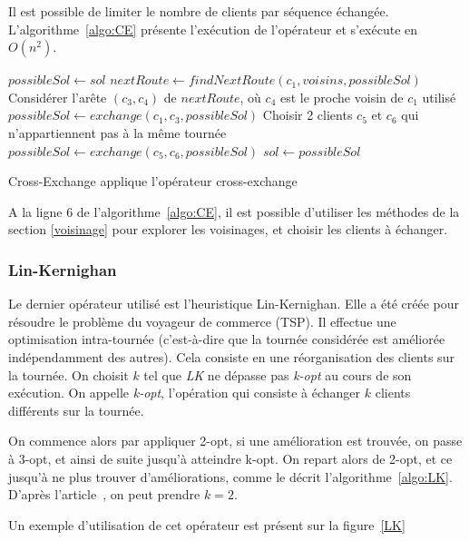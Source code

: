 \documentclass[a4paper,11pt]{article}%
\begin{document}
Il est possible de limiter le nombre de clients par séquence échangée.
L'algorithme~\ref{algo:CE} présente l'exécution de l'opérateur et s'exécute en $O(n^2)$.

\begin{algorithm}
\DontPrintSemicolon 
{}
$possibleSol \gets sol$\;
$nextRoute \gets findNextRoute(c_1,voisins,possibleSol)$\;
Considérer l'arête $(c_3,c_4)$ de $nextRoute$, où $c_4$ est le proche voisin de $c_1$ utilisé\;
$possibleSol \gets exchange(c_1,c_3,possibleSol)$\;
Choisir 2 clients $c_5$ et $c_6$ qui n'appartiennent pas à la même tournée\;
$possibleSol \gets exchange(c_5,c_6,possibleSol)$\;
 {
	$sol \gets possibleSol$\;
}
\;
\caption{{\sc Cross-Exchange} applique l'opérateur cross-exchange}
\label{algo:CE}
\end{algorithm}

A la ligne $6$ de l'algorithme~\ref{algo:CE}, il est possible d'utiliser les méthodes de la section \ref{voisinage} pour explorer les voisinages, et choisir les clients à échanger.

\subsubsection{Lin-Kernighan}

Le dernier opérateur utilisé est l'heuristique Lin-Kernighan. Elle a été créée pour résoudre le problème du voyageur de commerce (TSP). 
Il effectue une optimisation intra-tournée (c'est-à-dire que la tournée considérée est améliorée indépendamment des autres).
Cela consiste en une réorganisation des clients sur la tournée. On choisit $k$ tel que \emph{LK} ne dépasse pas \emph{k-opt} au cours de son exécution. 
On appelle \emph{k-opt}, l'opération qui consiste à échanger $k$ clients différents sur la tournée.

On commence alors par appliquer 2-opt, si une amélioration est trouvée, on passe à 3-opt, et ainsi de suite jusqu'à atteindre k-opt. 
On repart alors de 2-opt, et ce jusqu'à ne plus trouver d'améliorations, comme le décrit l'algorithme~\ref{algo:LK}.
D'après l'article~\cite{Sorensen_2017}, on peut prendre $k = 2$.
 
Un exemple d'utilisation de cet opérateur est présent sur la figure~\ref{LK}
\end{document}
